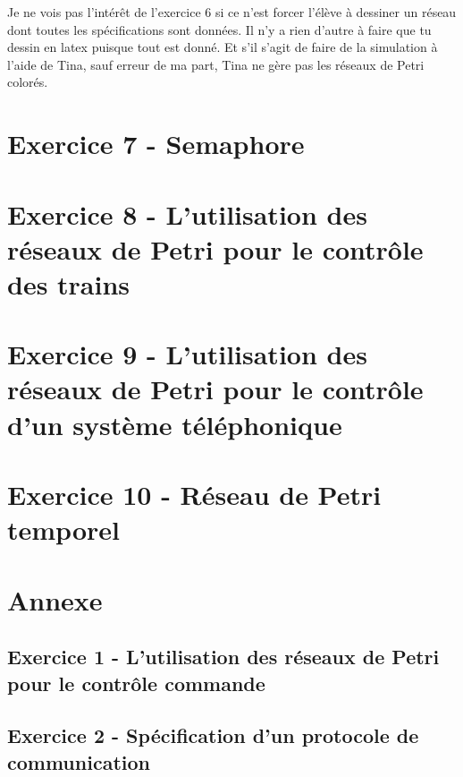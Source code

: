 \documentclass[a4paper,11pt]{article}
\begin{document}
Je ne vois pas l'intérêt de l'exercice $6$ si ce n'est forcer l'élève à dessiner un réseau dont
toutes les spécifications sont données. Il n'y a rien d'autre à faire que tu dessin en latex puisque
tout est donné. Et s'il s'agit de faire de la simulation à l'aide de Tina, sauf erreur de ma part,
Tina ne gère pas les réseaux de Petri colorés.

\section{Exercice 7 - Semaphore}



\section{Exercice 8 - L'utilisation des réseaux de Petri pour le contrôle des trains}



\section{Exercice 9 - L'utilisation des réseaux de Petri pour le contrôle d'un système téléphonique}



\section{Exercice 10 - Réseau de Petri temporel}



\section{Annexe}
\subsection{Exercice 1 - L'utilisation des réseaux de Petri pour le contrôle commande}



\subsection{Exercice 2 - Spécification d'un protocole de communication}


\end{document}
